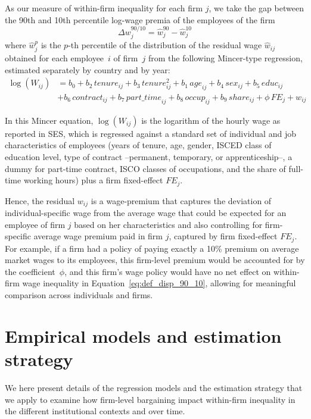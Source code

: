\documentclass[12pt]{article}
\begin{document}
As our measure of within-firm inequality for each firm $j$, we take the gap between the 90th and 10th percentile log-wage premia of the employees of the firm
\begin{equation}
  \label{eq:def_disp_90_10}
  \Delta w^{90/10}_j=\hat{w}^{90}_j - \hat{w}^{10}_j
\end{equation}
\noindent where $\hat{w}^p_j$ is the $p$-th percentile of the distribution of the residual wage $\hat{w}_{ij}$ obtained for each employee~$i$ of firm~$j$ from the following Mincer-type regression, estimated separately by country and by year:
\begin{equation}
\label{eq:mincer}
\begin{split}
\log \left(W_{ij} \right)
&= b_0 + b_2\,\mathit{tenure}_{ij} + b_3\,\mathit{tenure}_{ij}^2 + b_1\,\mathit{age}_{ij} + b_4\,\mathit{sex}_{ij} + b_5\,\mathit{educ}_{ij} \\
&+ b_6\,\mathit{contract}_{ij} + b_7\,\mathit{part\_time}_{ij} + b_8\,\mathit{occup}_{ij} + b_9\,\mathit{share}_{ij} + \phi \,\mathit{FE}_j + w_{ij}
\end{split}
\end{equation}

In this Mincer equation, $\log \left(W_{ij} \right)$ is the logarithm of the hourly wage as reported in SES, which is regressed against a standard set of individual and job characteristics of employees (years of tenure, age, gender, ISCED class of education level, type of contract --permanent, temporary, or apprenticeship--, a dummy for part-time contract, ISCO classes of occupations, and the share of full-time working hours) plus a firm fixed-effect $\mathit{FE}_j$. 

Hence, the residual $w_{ij}$ is a wage-premium that captures the deviation of individual-specific wage from the average wage that could be expected for an employee of firm $j$ based on her characteristics and also controlling for firm-specific average wage premium paid in firm $j$, captured by firm fixed-effect $\mathit{FE}_j$. For example, if a firm had a policy of paying exactly a 10\% premium on average market wages to its employees, this firm-level premium would be accounted for by the coefficient~$\phi$, and this firm's wage policy would have no net effect on within-firm wage inequality in Equation~\eqref{eq:def_disp_90_10}, allowing for meaningful comparison across individuals and firms. 


\section{Empirical models and estimation strategy}
\label{sec:empirical}
We here present details of the regression models and the estimation strategy that we apply to examine how firm-level bargaining impact within-firm inequality in the different institutional contexts and over time.
\end{document}
